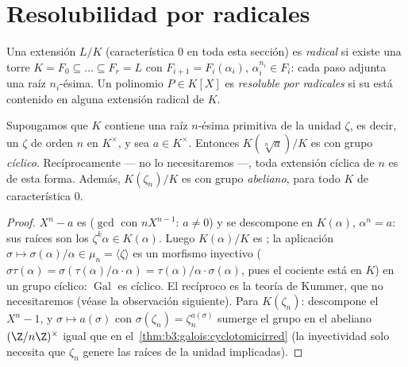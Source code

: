\section{Resolubilidad por radicales}

\begin{definition}\label{def:b3:galois:radical}
Una extensión $L/K$ (característica $0$ en toda esta sección) es
\emph{radical} si existe una torre $K = F_0 \subseteq \dots
\subseteq F_r = L$ con $F_{i+1} = F_i(\alpha_i)$,
$\alpha_i^{n_i} \in F_i$: cada paso adjunta una raíz $n_i$-ésima. Un
polinomio $P \in K[X]$ es \emph{resoluble por radicales} si su  está contenido en alguna extensión radical de $K$.
\end{definition}

\begin{lemma}\label{lem:b3:galois:cyclicsteps}
Supongamos que $K$ contiene una raíz $n$-ésima primitiva de la unidad
$\zeta$, es decir, un $\zeta$ de orden $n$ en $K^\times$, y sea
$a \in K^\times$. Entonces $K(\sqrt[n]a)/K$ es
 con grupo \emph{cíclico}.
Recíprocamente --- no lo necesitaremos ---, toda extensión cíclica de
 $n$ es de esta forma. Además,
$K(\zeta_n)/K$ es  con grupo
\emph{abeliano}, para todo $K$ de característica $0$.
\end{lemma}

\begin{proof}
$X^n - a$ es  ($\gcd$ con
$nX^{n-1}$: $a \neq 0$) y se descompone en $K(\alpha)$, $\alpha^n = a$:
sus raíces son los $\zeta^k\alpha \in K(\alpha)$. Luego $K(\alpha)/K$ es
; la aplicación
$\sigma \mapsto \sigma(\alpha)/\alpha \in \mu_n = \langle
\zeta\rangle$ es un morfismo inyectivo ($\sigma\tau(\alpha) =
\sigma(\tau(\alpha)/\alpha \cdot \alpha) =
\tau(\alpha)/\alpha\cdot\sigma(\alpha)$, pues el cociente está en $K$)
en un grupo cíclico: $\operatorname{Gal}$ es cíclico. El recíproco es la
teoría de Kummer, que no necesitaremos (véase la observación siguiente).
Para $K(\zeta_n)$: descompone el
 $X^n -
1$, y $\sigma \mapsto a(\sigma)$ con $\sigma(\zeta_n) =
\zeta_n^{a(\sigma)}$ sumerge el grupo en el abeliano $(\Z/n\Z)^\times$
igual que en el~\cref{thm:b3:galois:cyclotomicirred} (la inyectividad
solo necesita que $\zeta_n$ genere las raíces de la unidad implicadas).
\end{proof}

